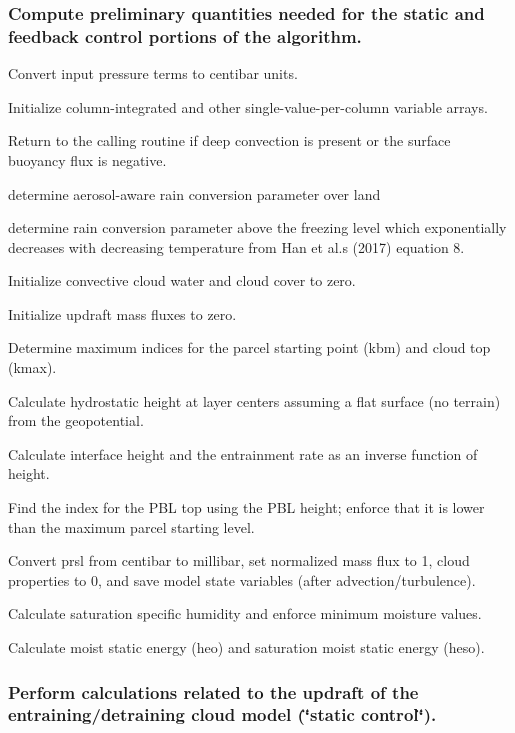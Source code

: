 \subsubsection*{Compute preliminary quantities needed for the static and feedback control portions of the algorithm.}


\begin{DoxyItemize}
\item Convert input pressure terms to centibar units.
\item Initialize column-\/integrated and other single-\/value-\/per-\/column variable arrays.
\item Return to the calling routine if deep convection is present or the surface buoyancy flux is negative.
\item determine aerosol-\/aware rain conversion parameter over land
\item determine rain conversion parameter above the freezing level which exponentially decreases with decreasing temperature from Han et al.\textquotesingle{}s (2017) \cite{han_et_al_2017} equation 8.
\item Initialize convective cloud water and cloud cover to zero.
\item Initialize updraft mass fluxes to zero.
\item Determine maximum indices for the parcel starting point (kbm) and cloud top (kmax).
\item Calculate hydrostatic height at layer centers assuming a flat surface (no terrain) from the geopotential.
\item Calculate interface height and the entrainment rate as an inverse function of height.
\item Find the index for the P\+BL top using the P\+BL height; enforce that it is lower than the maximum parcel starting level.
\item Convert prsl from centibar to millibar, set normalized mass flux to 1, cloud properties to 0, and save model state variables (after advection/turbulence).
\item Calculate saturation specific humidity and enforce minimum moisture values.
\item Calculate moist static energy (heo) and saturation moist static energy (heso).
\end{DoxyItemize}

\subsubsection*{Perform calculations related to the updraft of the entraining/detraining cloud model (\char`\"{}static control\char`\"{}).}


